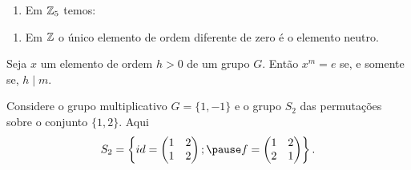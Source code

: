 \documentclass{beamer}
\begin{document}
    \begin{frame}
        \begin{exemplos}
            \begin{enumerate}[label={\roman*})]
                \conti

                \item Em $\mathbb{Z}_5$ temos:
                \seti
            \end{enumerate}
        \end{exemplos}
    \end{frame}

    \begin{frame}
        \begin{exemplos}
            \begin{enumerate}[label={\roman*})]
                \conti

                \item Em $\mathbb{Z}$ \pause o \'unico elemento de ordem diferente de zero \pause é o elemento neutro.
            \end{enumerate}
        \end{exemplos}
    \end{frame}

    \begin{frame}
        \begin{proposicao}
            Seja $x$ um elemento de ordem $h > 0$ \pause de um grupo $G$. \pause Então $x^m = e$ \pause se, e somente se, $h \mid m$.
        \end{proposicao}
    \end{frame}

    \begin{frame}
        Considere o grupo multiplicativo $G = \{1, -1\}$ \pause e o grupo $S_2$ das permutaç\~oes sobre o conjunto $\{1,2\}$. \pause Aqui
        \[
            S_2 = \left\{id = \begin{pmatrix}
                1 & 2\\1 & 2
            \end{pmatrix}; \pause f = \begin{pmatrix}
                1 & 2\\2 & 1
            \end{pmatrix}\right\}.
        \]
    \end{frame}
\end{document}
